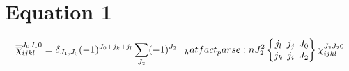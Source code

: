 \documentclass{scrartcl}
\newcommand{\sixj}[6]{\begingroup\setlength{\arraycolsep}{0.2em}\begin{Bmatrix} #1 & #2 & #3 \\ #4 & #5 & #6 \end{Bmatrix}\endgroup}
\begin{document}
\section{Equation 1}
\begin{dmath*}
\overline{\overline{\chi}}_{i j k l}^{{J}_{0} {J}_{1} 0} = \delta_{{J}_{1},{J}_{0}} \* (-1)^{{J}_{0}+{j}_{k}+{j}_{l}} \* \sum_{{J}_{2}} \* (-1)^{{J}_{2}} \* \hatfact{{J}_{2}^{2}} \* \sixj{{j}_{l}}{{j}_{j}}{{J}_{0}}{{j}_{k}}{{j}_{i}}{{J}_{2}} \* \bar{\chi}_{i j k l}^{{J}_{2} {J}_{2} 0}
\end{dmath*}
\end{document}
